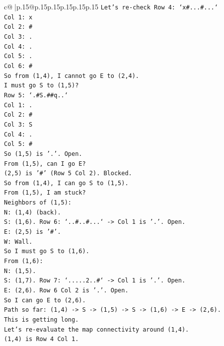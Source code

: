 \documentclass{article}
\begin{document}
{\begin{supertabular}{c@{$\;$}|p{.15\linewidth}@{}p{.15\linewidth}p{.15\linewidth}p{.15\linewidth}p{.15\linewidth}p{.15\linewidth}}
{{{\texttt{Let's re{-}check Row 4: `x\#...\#...`} \\
\texttt{Col 1: x} \\
\texttt{Col 2: \#} \\
\texttt{Col 3: .} \\
\texttt{Col 4: .} \\
\texttt{Col 5: .} \\
\texttt{Col 6: \#} \\
\texttt{So from (1,4), I cannot go E to (2,4).} \\
\texttt{I must go S to (1,5)?} \\
\texttt{Row 5: `.\#S.\#\#q..`} \\
\texttt{Col 1: .} \\
\texttt{Col 2: \#} \\
\texttt{Col 3: S} \\
\texttt{Col 4: .} \\
\texttt{Col 5: \#} \\
\texttt{So (1,5) is '.'. Open.} \\
\texttt{From (1,5), can I go E?} \\
\texttt{(2,5) is '\#' (Row 5 Col 2). Blocked.} \\
\texttt{So from (1,4), I can go S to (1,5).} \\
\texttt{From (1,5), I am stuck?} \\
\texttt{Neighbors of (1,5):} \\
\texttt{N: (1,4) (back).} \\
\texttt{S: (1,6). Row 6: `..\#..\#...` {-}> Col 1 is '.'. Open.} \\
\texttt{E: (2,5) is '\#'.} \\
\texttt{W: Wall.} \\
\texttt{So I must go S to (1,6).} \\
\texttt{From (1,6):} \\
\texttt{N: (1,5).} \\
\texttt{S: (1,7). Row 7: `.....2..\#` {-}> Col 1 is '.'. Open.} \\
\texttt{E: (2,6). Row 6 Col 2 is '.'. Open.} \\
\texttt{So I can go E to (2,6).} \\
\texttt{Path so far: (1,4) {-}> S {-}> (1,5) {-}> S {-}> (1,6) {-}> E {-}> (2,6).} \\
\texttt{This is getting long.} \\
\texttt{Let's re{-}evaluate the map connectivity around (1,4).} \\
\texttt{(1,4) is Row 4 Col 1.} \\
}}}
\end{supertabular}}
\end{document}

